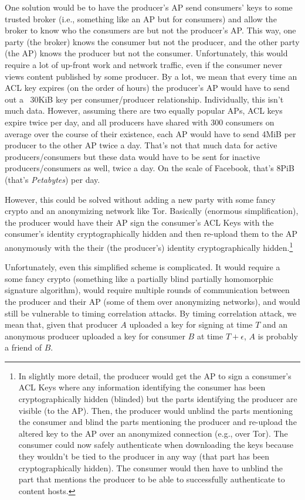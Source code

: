 \documentclass[pdftex,12pt,a4papaer,twoside,notitlepage]{report}
\begin{document}
One solution would be to have the producer's AP send consumers' keys to some
trusted broker (i.e., something like an AP but for consumers) and allow the
broker to know who the consumers are but not the producer's AP. This way, one
party (the broker) knows the consumer but not the producer, and the other party
(the AP) knows the producer but not the consumer. Unfortunately, this would
require a lot of up-front work and network traffic, even if the consumer never
views content published by some producer. By a lot, we mean that every time an
ACL key expires (on the order of hours) the producer's AP would have to send out
a ~30KiB key per consumer/producer relationship. Individually, this isn't much
data. However, assuming there are two equally popular APs, ACL keys expire twice
per day, and all producers have shared with 300 consumers on average over the
course of their existence, each AP would have to send 4MiB per producer to the
other AP twice a day. That's not that much data for active producers/consumers
but these data would have to be sent for inactive producers/consumers as well,
twice a day. On the scale of Facebook, that's 8PiB (that's \emph{Petabytes}) per
day.

However, this could be solved without adding a new party with some fancy crypto
and an anonymizing network like Tor. Basically (enormous simplification), the
producer would have their AP sign the consumer's ACL Keys with the consumer's
identity cryptographically hidden and then re-upload them to the AP anonymously
with the their (the producer's) identity cryptographically hidden.\footnote{In
  slightly more detail, the producer would get the AP to sign a consumer's ACL
  Keys where any information identifying the consumer has been cryptographically
  hidden (blinded) but the parts identifying the producer are visible (to the
  AP). Then, the producer would unblind the parts mentioning the consumer and
  blind the parts mentioning the producer and re-upload the altered key to the AP
  over an anonymized connection (e.g., over Tor). The consumer could now safely
  authenticate when downloading the keys because they wouldn't be tied to the
  producer in any way (that part has been cryptographically hidden). The
  consumer would then have to unblind the part that mentions the producer to be
  able to successfully authenticate to content hosts.}

Unfortunately, even this simplified scheme is complicated. It would require a
some fancy crypto (something like a partially blind partially homomorphic
signature algorithm), would require multiple rounds of communication between the
producer and their AP (some of them over anonymizing networks), and would still
be vulnerable to timing correlation attacks. By timing correlation attack, we
mean that, given that producer $A$ uploaded a key for signing at time $T$ and an
anonymous producer uploaded a key for consumer $B$ at time $T+\epsilon$, $A$ is
probably a friend of $B$.
\end{document}

